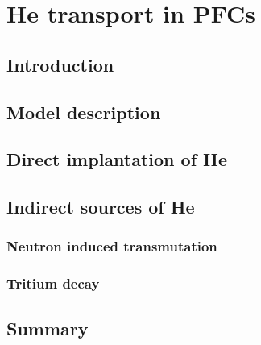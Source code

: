 \chapter{He transport in PFCs}
\label{Chapter4} %

\section{Introduction}

\section{Model description}

\section{Direct implantation of He}

\section{Indirect sources of He}
\subsection{Neutron induced transmutation}

\subsection{Tritium decay}

\section{Summary}